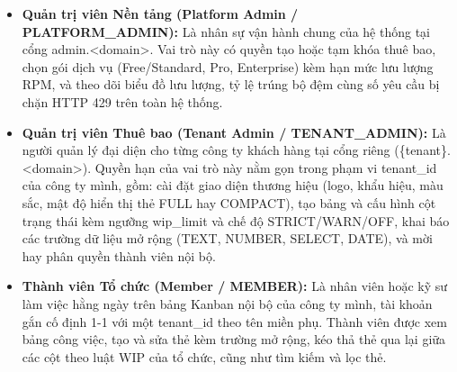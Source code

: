 \begin{itemize}
\item
  \textbf{Quản trị viên Nền tảng (Platform Admin / PLATFORM\_\allowbreak{}ADMIN):} Là nhân sự vận hành chung của hệ thống tại cổng admin.\textless domain\textgreater. Vai trò này có quyền tạo hoặc tạm khóa thuê bao, chọn gói dịch vụ (Free/Standard, Pro, Enterprise) kèm hạn mức lưu lượng RPM, và theo dõi biểu đồ lưu lượng, tỷ lệ trúng bộ đệm cùng số yêu cầu bị chặn HTTP 429 trên toàn hệ thống.
\item
  \textbf{Quản trị viên Thuê bao (Tenant Admin / TENANT\_\allowbreak{}ADMIN):} Là người quản lý đại diện cho từng công ty khách hàng tại cổng riêng (\{tenant\}.\textless domain\textgreater). Quyền hạn của vai trò này nằm gọn trong phạm vi tenant\_\allowbreak{}id của công ty mình, gồm: cài đặt giao diện thương hiệu (logo, khẩu hiệu, màu sắc, mật độ hiển thị thẻ FULL hay COMPACT), tạo bảng và cấu hình cột trạng thái kèm ngưỡng wip\_\allowbreak{}limit và chế độ STRICT/WARN/OFF, khai báo các trường dữ liệu mở rộng (TEXT, NUMBER, SELECT, DATE), và mời hay phân quyền thành viên nội bộ.
\item
  \textbf{Thành viên Tổ chức (Member / MEMBER):} Là nhân viên hoặc kỹ sư làm việc hằng ngày trên bảng Kanban nội bộ của công ty mình, tài khoản gắn cố định 1-1 với một tenant\_\allowbreak{}id theo tên miền phụ. Thành viên được xem bảng công việc, tạo và sửa thẻ kèm trường mở rộng, kéo thả thẻ qua lại giữa các cột theo luật WIP của tổ chức, cũng như tìm kiếm và lọc thẻ.
\end{itemize}


